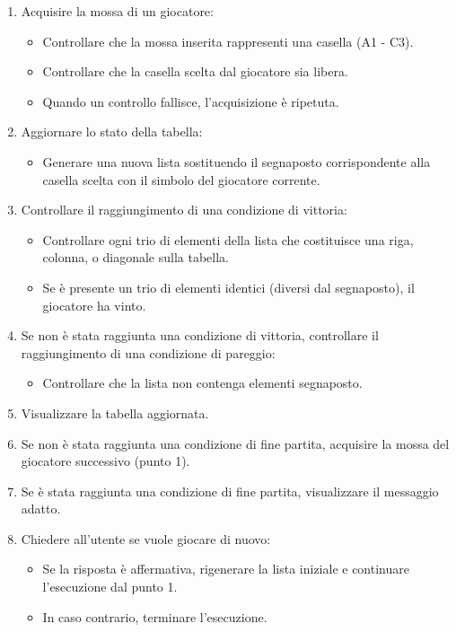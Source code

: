 \documentclass{article}
\begin{document}
\begin{enumerate}
    \item Acquisire la mossa di un giocatore:
    \begin{itemize}
        \item Controllare che la mossa inserita rappresenti una casella (A1 - C3).
        \item Controllare che la casella scelta dal giocatore sia libera.
        \item Quando un controllo fallisce, l'acquisizione è ripetuta.
    \end{itemize}
    \item Aggiornare lo stato della tabella:
    \begin{itemize}
        \item Generare una nuova lista sostituendo il segnaposto corrispondente alla casella scelta con il simbolo del giocatore corrente.
    \end{itemize}
    \item Controllare il raggiungimento di una condizione di vittoria:
     \begin{itemize}
        \item Controllare ogni trio di elementi della lista che costituisce una riga, colonna, o diagonale sulla tabella.
        \item Se è presente un trio di elementi identici (diversi dal segnaposto), il giocatore ha vinto.
    \end{itemize}
    \item Se non è stata raggiunta una condizione di vittoria, controllare il raggiungimento di una condizione di pareggio:
    \begin{itemize}
        \item Controllare che la lista non contenga elementi segnaposto.
    \end{itemize}
    \item Visualizzare la tabella aggiornata.
    \item Se non è stata raggiunta una condizione di fine partita, acquisire la mossa del giocatore successivo (punto 1).
    \item Se è stata raggiunta una condizione di fine partita, visualizzare il messaggio adatto.
    \item Chiedere all'utente se vuole giocare di nuovo:
    \begin{itemize}
        \item Se la risposta è affermativa, rigenerare la lista iniziale e continuare l'esecuzione dal punto 1.
        \item In caso contrario, terminare l'esecuzione.
    \end{itemize}
\end{enumerate}
\newpage
\end{document}
